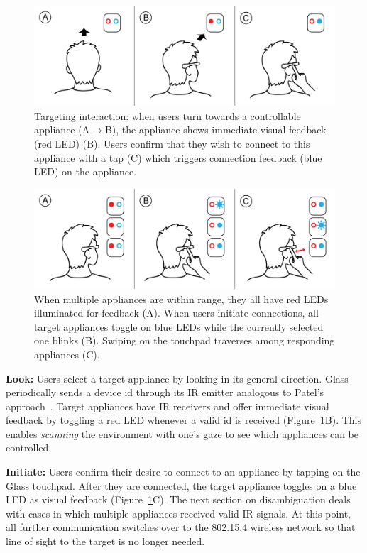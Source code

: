 \documentclass{sigchi}
\begin{document}
\begin{figure}[t!]
\centering
\includegraphics[width=\columnwidth]{figures/stepbystep_small.png}
\caption{Targeting interaction: when users turn towards a controllable appliance (A$\rightarrow$B), the appliance shows immediate visual feedback (red LED) (B). Users confirm that they wish to connect to this appliance with a tap (C) which triggers connection feedback (blue LED) on the appliance.}
\label{fig:interaction}
\end{figure}

\begin{figure}[t!]
\centering
\includegraphics[width=\columnwidth]{figures/stepbystep_multi_small.png}
\caption{When multiple appliances are within range, they all have red LEDs illuminated for feedback (A). When users initiate connections, all target appliances toggle on blue LEDs while the currently selected one blinks (B). Swiping on the touchpad traverses among responding appliances (C).}
\label{fig:interaction_multi}
\end{figure}

{\bf Look:} Users select a target appliance by looking in its general direction.
Glass periodically sends a device id through its IR emitter analogous to Patel's approach~\cite{patel_2-way_2003}. Target appliances have IR receivers and offer immediate visual feedback by toggling a red LED whenever a valid id is received (Figure~\ref{fig:interaction}B). This enables {\em scanning} the environment with one's gaze to see which appliances can be controlled.

{\bf Initiate:} Users confirm their desire to connect to an appliance by tapping on the Glass touchpad. After they are connected, the target appliance toggles on a blue LED as visual feedback (Figure~\ref{fig:interaction}C). The next section on disambiguation deals with cases in which multiple appliances received valid IR signals. At this point, all further communication switches over to the 802.15.4 wireless network so that line of sight to the target is no longer needed.
\end{document}
